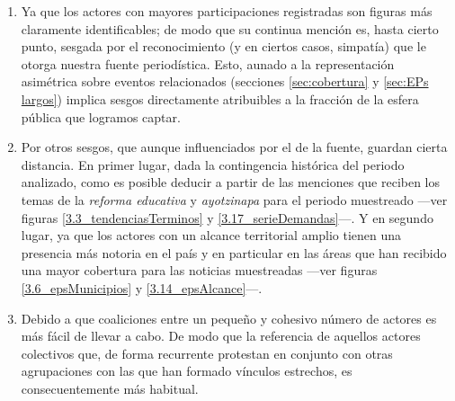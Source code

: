 \documentclass[letterpaper, 11pt]{book}
\theoremstyle{definition}
\theoremstyle{remark}
\begin{document}
\begin{enumerate}
    \setlength\itemsep{0em}
    \item Ya que los actores con mayores participaciones registradas son figuras más claramente identificables; de modo que su continua mención es, hasta cierto punto, sesgada por el reconocimiento (y en ciertos casos, simpatía) que le otorga nuestra fuente periodística. 
    Esto, aunado a la representación asimétrica sobre eventos relacionados (secciones \ref{sec:cobertura} y \ref{sec:EPs largos}) implica sesgos directamente atribuibles a la fracción de la esfera pública que logramos captar.
    
    \item Por otros sesgos, que aunque influenciados por el de la fuente, guardan cierta distancia. 
    En primer lugar, dada la contingencia histórica del periodo analizado, como es posible deducir a partir de las menciones que reciben los temas de la \emph{reforma educativa} y \emph{ayotzinapa} para el periodo muestreado ---ver figuras \ref{3.3_tendenciasTerminos} y \ref{3.17_serieDemandas}---. 
    Y en segundo lugar, ya que los actores con un alcance territorial amplio tienen una presencia más notoria en el país y en particular en las áreas que han recibido una mayor cobertura para las noticias muestreadas ---ver figuras \ref{3.6_epsMunicipios} y \ref{3.14_epsAlcance}---. 
    
    \item Debido a que coaliciones entre un pequeño y cohesivo número de actores es más fácil de llevar a cabo. 
    De modo que la referencia de aquellos actores colectivos que, de forma recurrente protestan en conjunto con otras agrupaciones con las que han formado vínculos estrechos, es consecuentemente más habitual. 
    

\end{enumerate}
\end{document}
